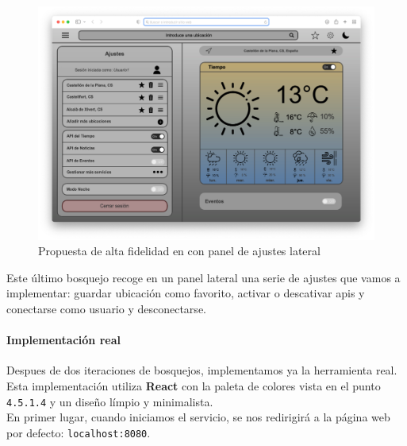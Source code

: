 \documentclass[../ei103948-project-documentation.tex]{subfiles}
\begin{document}
                                \vspace*{-5mm}
                                \begin{figure}[H]
                                    \begin{center}
                                        \hspace*{-8mm}
                                    \includegraphics[scale=0.867]{images/Boceto4.png}
                                    \end{center}
                                    \caption{Propuesta de alta fidelidad en con panel de ajustes lateral}
                                \end{figure}

                                Este último bosquejo recoge en un panel lateral una serie de ajustes que vamos a implementar: guardar ubicación como favorito, activar o descativar apis y conectarse como usuario y desconectarse.\\

                                \paragraph{Implementación real}

                                Despues de dos iteraciones de bosquejos, implementamos ya la herramienta real. Esta implementación utiliza \textbf{React} con la paleta de colores vista en el punto \texttt{4.5.1.4} y un diseño límpio y minimalista.\\

                                En primer lugar, cuando iniciamos el servicio, se nos redirigirá a la página web por defecto: \texttt{localhost:8080}.\\
\end{document}
